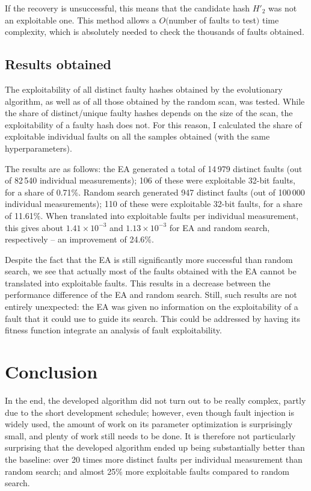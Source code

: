 \documentclass[times, utf8, diplomski]{fer}
\begin{document}
If the recovery is unsuccessful, this means that the candidate hash $H'_2$ was
not an exploitable one. This method allows a $O($number of faults to test$)$
time complexity, which is absolutely needed to check the thousands of faults
obtained.


\section{Results obtained}
The exploitability of all distinct faulty hashes obtained by the evolutionary
algorithm, as well as of all those obtained by the random scan, was tested.
While the share of distinct/unique faulty hashes depends on the size of the scan,
the exploitability of a faulty hash does not. For this reason, I calculated the
share of exploitable individual faults on all the samples obtained (with the
same hyperparameters).


The results are as follows:
the EA generated a total of 14\,979 distinct faults (out of 82\,540 individual
measurements); 106 of these were exploitable 32-bit faults, for a share of 0.71\%.
Random search generated 947 distinct faults (out of 100\,000 individual
measurements); 110 of these were exploitable 32-bit faults, for a share of 11.61\%.
When translated into exploitable faults per individual measurement, this gives
about $1.41 \times 10^{-3}$ and $1.13 \times 10^{-3}$ for EA and random
search, respectively -- an improvement of 24.6\%.

Despite the fact that the EA is still significantly more successful than random search,
we see that actually most of the faults obtained with the EA cannot be translated into
exploitable faults. This results in a decrease between the performance difference
of the EA and random search. Still, such results are not entirely unexpected:
the EA was given no information on the exploitability of a fault that it could
use to guide its search. This could be addressed by having its fitness function
integrate an analysis of fault exploitability.



\chapter{Conclusion}\label{ch:conclusion}
In the end, the developed algorithm did not turn out to be really complex,
partly due to the short development schedule; however, even though fault injection
is widely used, the amount of work on its parameter optimization is surprisingly
small, and plenty of work still needs to be done. It is therefore not particularly
surprising that the developed algorithm ended up being substantially better than
the baseline: over 20 times more distinct faults per individual measurement than
random search; and almost 25\% more exploitable faults compared to random search.
\end{document}
